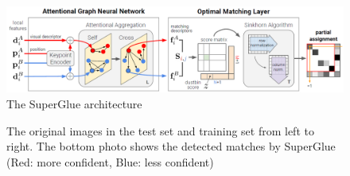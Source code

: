 \documentclass[conference]{IEEEtran}
\begin{document}
\begin{figure}
\centerline{\includegraphics[scale=0.26]{Pics/SuperGlue Architecture.png}}
\caption{The SuperGlue architecture \cite{b12}}
\label{fig:SuperGlue}
\end{figure}

\begin{figure}
    \centering
    \caption{The original images in the test set and training set from left to right. The bottom photo shows the detected matches by SuperGlue (Red: more confident, Blue: less confident)}
    \label{fig:SuperGluematches}
\end{figure}
\end{document}
